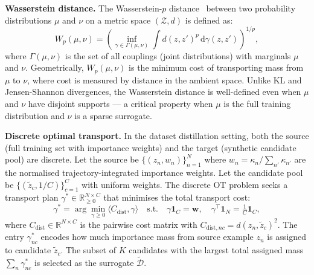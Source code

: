 \begin{foldable}
  \textbf{Wasserstein distance.}
  The Wasserstein-$p$ distance~\cite{villani2008optimal} between two probability distributions $\mu$ and $\nu$ on a metric space $(\mathcal{Z}, d)$ is defined as:
  \begin{equation}
    \label{eq:wasserstein}
    W_p(\mu, \nu) = \left(\inf_{\gamma \in \Gamma(\mu,\nu)} \int d(z, z')^p \, \mathrm{d}\gamma(z, z') \right)^{1/p},
  \end{equation}
  where $\Gamma(\mu, \nu)$ is the set of all couplings (joint distributions) with marginals $\mu$ and $\nu$.
  Geometrically, $W_p(\mu, \nu)$ is the minimum cost of transporting mass from $\mu$ to $\nu$, where cost is measured by distance in the ambient space.
  Unlike KL and Jensen-Shannon divergences, the Wasserstein distance is well-defined even when $\mu$ and $\nu$ have disjoint supports --- a critical property when $\mu$ is the full training distribution and $\nu$ is a sparse surrogate.
\end{foldable}

\begin{foldable}
  \textbf{Discrete optimal transport.}
  In the dataset distillation setting, both the source (full training set with importance weights) and the target (synthetic candidate pool) are discrete.
  Let the source be $\{(z_n, w_n)\}_{n=1}^{N}$ where $w_n = \kappa_n / \sum_{n'} \kappa_{n'}$ are the normalised trajectory-integrated importance weights.
  Let the candidate pool be $\{(\tilde{z}_c, 1/C)\}_{c=1}^{C}$ with uniform weights.
  The discrete OT problem seeks a transport plan $\gamma^* \in \mathbb{R}^{N \times C}_{\geq 0}$ that minimises the total transport cost:
  \begin{equation}
    \gamma^* = \arg\min_{\gamma \geq 0} \langle C_{\mathrm{dist}}, \gamma \rangle
    \quad \text{s.t.} \quad \gamma \mathbf{1}_C = \mathbf{w}, \quad
    \gamma^\top \mathbf{1}_N = \tfrac{1}{C}\mathbf{1}_C,
    \label{eq:discrete-ot}
  \end{equation}
  where $C_{\mathrm{dist}} \in \mathbb{R}^{N \times C}$ is the pairwise cost matrix with $C_{\mathrm{dist},nc} = d(z_n, \tilde{z}_c)^2$.
  The entry $\gamma^*_{nc}$ encodes how much importance mass from source example $z_n$ is assigned to candidate $\tilde{z}_c$.
  The subset of $K$ candidates with the largest total assigned mass $\sum_n \gamma^*_{nc}$ is selected as the surrogate $\tilde{\mathcal{D}}$.
\end{foldable}


